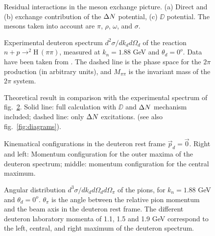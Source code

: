 \begin{figure}
  \begin{center} 
  \end{center}
  \caption{Residual interactions in the meson exchange picture.
    (a) Direct and (b) exchange contribution of the ${\Delta N}$ potential,
    (c) $\DD$ potential. The mesons taken into account are
    $\pi$, $\rho$, $\omega$, and $\sigma$.}
  \label{fig:potential}
\end{figure}  

\pagebreak

\begin{figure}
  \begin{center}
  \end{center}
  \caption{Experimental deuteron spectrum $d^2 \sigma / dk_d d\Omega_d$
    of the reaction $n+p \to ^2$H$\, (\pi\pi)$, measured at $k_n = 1.88$ GeV
    and $\theta_d = 0^o$. Data have been taken from \protect \cite{plouin78}.
    The dashed line is the phase space for the $2 \pi$ production 
    (in arbitrary units), and $M_{\pi\pi}$ is the invariant mass of the 
    $2 \pi$ system.}
  \label{fig:expspect}
\end{figure}  

\begin{figure}
  \begin{center}    
  \end{center}
  \caption{Theoretical result in comparison with the experimental spectrum
    of fig.\ \protect \ref{fig:expspect}. Solid line: full calculation
    with $\DD$ and ${\Delta N}$ mechanism included; dashed line: only ${\Delta N}$ excitations.
    (see also fig.\ \protect \ref{fig:diagrams}).}
  \label{fig:theospect}
\end{figure}  

\begin{figure}
  \begin{center}
  \end{center}
  \caption{Kinematical configurations in the deuteron rest frame 
    $\vec p_d = \vec 0$. Right and left: Momentum configuration for the
    outer maxima of the deuteron spectrum; middle: momentum configuration
    for the central maximum.}
  \label{fig:kinematics}
\end{figure}  

\begin{figure}
  \begin{center}
  \end{center}
  \caption{Angular distribution $d^3 \sigma / dk_d d\Omega_d d\Omega_\pi$
     of the pions, for $k_n = 1.88$ GeV and $\theta_d = 0^o$. 
     $\theta_\pi$ is the angle between the relative pion momentum
     and the beam axis in the deuteron rest frame. The different
     deuteron laboratory momenta of 1.1, 1.5 and 1.9 GeV correspond
     to the left, central, and right maximum of the deuteron spectrum.}
  \label{fig:angdist1}
\end{figure}  

